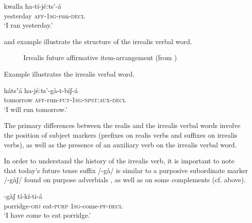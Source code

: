 \documentclass[output=paper]{langsci/langscibook}
\begin{document}
\ea\label{ex:mahland:73}
\gll kwalla    ha-tí-jéːts'-{\downstep}á \\
yesterday  \textsc{aff-1sg}{}-run\textsc{{}-decl} \\
\glt `I ran yesterday.'
\z

 and example  illustrate the structure of the irrealis verbal word. 

\begin{figure}
\caption{Irrealis future affirmative item-arrangement (from \citealt[4]{Ahland2014b})}
\label{fig:mahland:4}
\end{figure}

Example  illustrates the irrealis verbal word. 


\ea\label{ex:mahland:74}
\gll hátsʼá    ha-jéːts'-gà-t-bíʃ-á     \\
tomorrow  \textsc{aff}{}-run-\textsc{fut-1sg-npst:aux-decl} \\
\glt `I will run tomorrow.'
\z

The primary differences between the realis and the irrealis verbal words involve the position of subject markers (prefixes on realis verbs and suffixes on irrealis verbs), as well as the presence of an auxiliary verb on the irrealis verbal word. 

In order to understand the history of the irrealis verb, it is important to note that today's future tense suffix /-gà/ is similar to a purposive subordinate marker /-gàʃ/ found on purpose adverbials , as well as on some complements  (cf.  above). 

\ea\label{ex:mahland:75}
\gll [kàːl-là     mí]-gàʃ  tí-kí-ti-á\\
  porridge-\textsc{obj}    eat-\textsc{purp}  \textsc{1sg}{}-come-\textsc{pf-decl} \\
  \glt `I have come to eat porridge.'
\z
\end{document}
